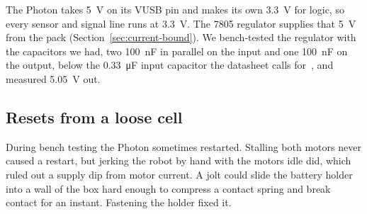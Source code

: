 The Photon takes \qty{5}{V} on its VUSB pin and makes its own \qty{3.3}{V} for logic, so every sensor and signal line runs at \qty{3.3}{V}. The 7805 regulator supplies that \qty{5}{V} from the pack (Section~\ref{sec:current-bound}). We bench-tested the regulator with the capacitors we had, two \qty{100}{nF} in parallel on the input and one \qty{100}{nF} on the output, below the \qty{0.33}{\micro F} input capacitor the datasheet calls for~\cite{reg7805}, and measured \qty{5.05}{V} out.

\subsection{Resets from a loose cell}
\label{sec:resets}

During bench testing the Photon sometimes restarted. Stalling both motors never caused a restart, but jerking the robot by hand with the motors idle did, which ruled out a supply dip from motor current. A jolt could slide the battery holder into a wall of the box hard enough to compress a contact spring and break contact for an instant. Fastening the holder fixed it.
